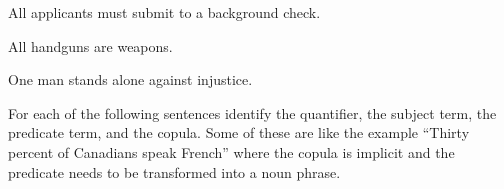 \begin{exercises}
\item All applicants must submit to a background check. 

\item All handguns are weapons.

\item One man stands alone against injustice.

\end{exercises}



\noindent \problempart For each of the following sentences identify the quantifier, the subject term, the predicate term, and the copula. Some of these are like the example ``Thirty percent of Canadians speak French'' where the copula is implicit and the predicate needs to be transformed into a noun phrase. 



